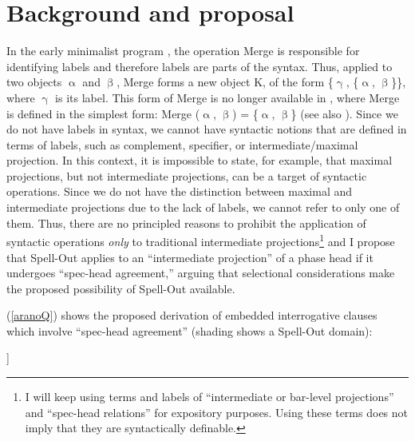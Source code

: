 \documentclass[output=paper]{langscibook}
\begin{document}
\section{Background and proposal}\label{aranosect2}
In the early minimalist program \citep{Chomsky:1995}, the operation Merge is responsible for identifying labels and therefore labels are parts of the syntax. Thus, applied to two objects $\upalpha$ and $\upbeta$, Merge forms a new object K, of the form \{$\upgamma$, \{$\upalpha$, $\upbeta$\}\}, where $\upgamma$ is its label. This form of Merge is no longer available in \citet{Chomsky:2013, Chomsky:2015}, where Merge is defined in the simplest form: Merge ($\upalpha$, $\upbeta$) = \{$\upalpha$, $\upbeta$\} (see also \citealt{Collins:2002a}). Since we do not have labels in syntax, we cannot have syntactic notions that are defined in terms of labels, such as complement, specifier, or intermediate/maximal projection. In this context, it is impossible to state, for example, that maximal projections, but not intermediate projections, can be a target of syntactic operations. Since we do not have the distinction between maximal and intermediate projections due to the lack of labels, we cannot refer to only one of them. Thus, there are no principled reasons to prohibit the application of syntactic operations \emph{only} to traditional intermediate projections\footnote{I will keep using terms and labels of ``intermediate or bar-level projections'' and ``spec-head relations'' for expository purposes. Using these terms does not imply that they are syntactically definable.} and I propose that Spell-Out applies to an ``intermediate projection'' of a phase head if it undergoes ``spec-head agreement,'' arguing that selectional considerations make the proposed possibility of Spell-Out available.

(\ref{aranoQ}) shows the proposed derivation of embedded interrogative clauses which involve ``spec-head agreement'' (shading shows a Spell-Out domain):

\ea \label{aranoQ} {} \upshape
 [\sub{vP} wonder [ what$_\mathrm{i}$ \shade{C$_{\mathrm{Q}}$ [\sub{TP} you T$_\mathrm{\upphi}$ cook t$_\mathrm{i}$]}]]
\z 
\end{document}

